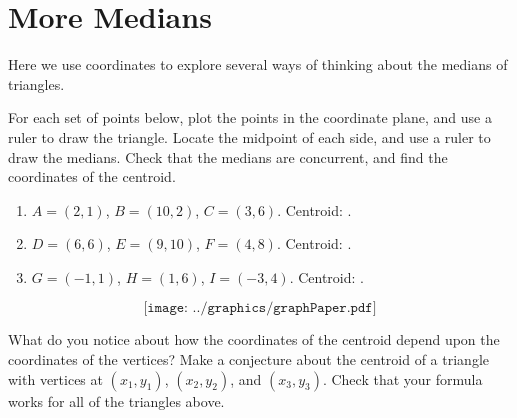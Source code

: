 \newpage

\section{More Medians}
Here we use coordinates to explore several ways of thinking about the medians of triangles.  

\begin{prob}
For each set of points below, plot the points in the coordinate plane, and use a ruler to draw the triangle.  Locate the midpoint of each side, and use a ruler to draw the medians.   Check that the medians are concurrent, and find the coordinates of the centroid.  
\begin{enumerate}
\setlength{\itemsep}{4pt}
\item $A=(2, 1)$, $B=(10, 2)$, $C=(3, 6)$.  Centroid: \underline{\hspace{1.5cm}}. 
\item $D=(6, 6)$, $E=(9, 10)$, $F=(4, 8)$.  Centroid: \underline{\hspace{1.5cm}}. 
\item $G=(-1, 1)$, $H=(1, 6)$, $I=(-3, 4)$.  Centroid: \underline{\hspace{1.5cm}}. 
\end{enumerate}

$$\texttt{[image: ../graphics/graphPaper.pdf]}$$

\end{prob}

\begin{prob}
What do you notice about how the coordinates of the centroid depend upon the coordinates of the vertices?  Make a conjecture about the centroid of a triangle with vertices at $(x_1, y_1)$, $(x_2, y_2)$, and $(x_3, y_3)$.  Check that your formula works for all of the triangles above.
\end{prob}

